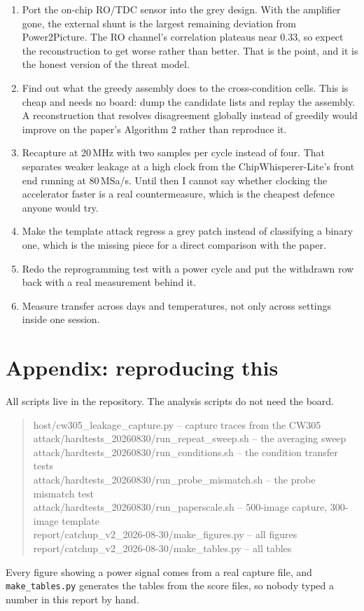 \documentclass[11pt,a4paper]{article}
\begin{document}
\begin{enumerate}
\item Port the on-chip RO/TDC sensor into the grey design. With the amplifier gone, the
      external shunt is the largest remaining deviation from Power2Picture. The RO
      channel's correlation plateaus near $0.33$, so expect the reconstruction to get
      worse rather than better. That is the point, and it is the honest version of the
      threat model.
\item Find out what the greedy assembly does to the cross-condition cells. This is cheap
      and needs no board: dump the candidate lists and replay the assembly. A
      reconstruction that resolves disagreement globally instead of greedily would improve
      on the paper's Algorithm 2 rather than reproduce it.
\item Recapture at 20\,MHz with two samples per cycle instead of four. That separates
      weaker leakage at a high clock from the ChipWhisperer-Lite's front end running at
      80\,MSa/s. Until then I cannot say whether clocking the accelerator faster is a real
      countermeasure, which is the cheapest defence anyone would try.
\item Make the template attack regress a grey patch instead of classifying a binary one,
      which is the missing piece for a direct comparison with the paper.
\item Redo the reprogramming test with a power cycle and put the withdrawn row back with a
      real measurement behind it.
\item Measure transfer across days and temperatures, not only across settings inside one
      session.
\end{enumerate}

\section*{Appendix: reproducing this}

All scripts live in the repository. The analysis scripts do not need the board.

\begin{quote}\footnotesize\ttfamily
host/cw305\_leakage\_capture.py \quad -- capture traces from the CW305\\
attack/hardtests\_20260830/run\_repeat\_sweep.sh \quad -- the averaging sweep\\
attack/hardtests\_20260830/run\_conditions.sh \quad -- the condition transfer tests\\
attack/hardtests\_20260830/run\_probe\_mismatch.sh \quad -- the probe mismatch test\\
attack/hardtests\_20260830/run\_paperscale.sh \quad -- 500-image capture, 300-image template\\
report/catchup\_v2\_2026-08-30/make\_figures.py \quad -- all figures\\
report/catchup\_v2\_2026-08-30/make\_tables.py \quad -- all tables
\end{quote}

Every figure showing a power signal comes from a real capture file, and \texttt{make\_tables.py}
generates the tables from the score files, so nobody typed a number in this report by hand.
\end{document}
